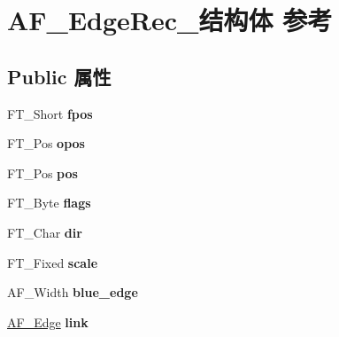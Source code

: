 \hypertarget{struct_a_f___edge_rec__}{}\section{A\+F\+\_\+\+Edge\+Rec\+\_\+结构体 参考}
\label{struct_a_f___edge_rec__}
\subsection*{Public 属性}
\begin{DoxyCompactItemize}
\item 
\mbox{\label{struct_a_f___edge_rec___a7890171d1e3f1fbd44b2ab7196594d46}} 
F\+T\+\_\+\+Short {\bfseries fpos}
\item 
\mbox{\label{struct_a_f___edge_rec___a8c44f0a3e4aa3254b0dd5777ad3a997b}} 
F\+T\+\_\+\+Pos {\bfseries opos}
\item 
\mbox{\label{struct_a_f___edge_rec___a2b8e96f147dcff3bcf0bcdfff6924256}} 
F\+T\+\_\+\+Pos {\bfseries pos}
\item 
\mbox{\label{struct_a_f___edge_rec___aad7515038f97e092e10ff4e84bab74ca}} 
F\+T\+\_\+\+Byte {\bfseries flags}
\item 
\mbox{\label{struct_a_f___edge_rec___a04e72c31f57dd4317b95445cf649c1db}} 
F\+T\+\_\+\+Char {\bfseries dir}
\item 
\mbox{\label{struct_a_f___edge_rec___adbe043461299da1038f8926014502ddf}} 
F\+T\+\_\+\+Fixed {\bfseries scale}
\item 
\mbox{\label{struct_a_f___edge_rec___a160286adea871656eab8db699a77022e}} 
A\+F\+\_\+\+Width {\bfseries blue\+\_\+edge}
\item 
\mbox{\label{struct_a_f___edge_rec___a41f8d4233ca7d53b4233ebbe86dc9869}} 
\hyperlink{struct_a_f___edge_rec__}{A\+F\+\_\+\+Edge} {\bfseries link}
\item 
\mbox{\label{struct_a_f___edge_rec___a12d7731f9283877723fc7a2d9c40d937}} 

\end{DoxyCompactItemize}
